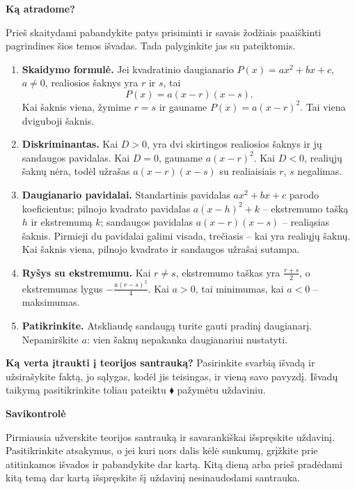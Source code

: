 \documentclass[12pt,a4paper]{article}
\begin{document}
\newpage
\begin{center}{\Large\bfseries Ką atradome?}\end{center}
Prieš skaitydami pabandykite patys prisiminti ir savais žodžiais paaiškinti pagrindines šios temos išvadas. Tada palyginkite jas su pateiktomis.
\begin{tcolorbox}[title=Svarbiausios temos išvados,colback=black!3,colframe=black!65,boxrule=0.6pt,arc=2mm]
\begin{enumerate}
\item \textbf{Skaidymo formulė.} Jei kvadratinio daugianario $P(x)=ax^2+bx+c$, $a\ne0$, realiosios šaknys yra $r$ ir $s$, tai
\[P(x)=a(x-r)(x-s).\]
Kai šaknis viena, žymime $r=s$ ir gauname $P(x)=a(x-r)^2$. Tai viena dviguboji šaknis.
\item \textbf{Diskriminantas.} Kai $D>0$, yra dvi skirtingos realiosios šaknys ir jų sandaugos pavidalas. Kai $D=0$, gauname $a(x-r)^2$. Kai $D<0$, realiųjų šaknų nėra, todėl užrašas $a(x-r)(x-s)$ su realiaisiais $r$, $s$ negalimas.
\item \textbf{Daugianario pavidalai.} Standartinis pavidalas $ax^2+bx+c$ parodo koeficientus; pilnojo kvadrato pavidalas $a(x-h)^2+k$ – ekstremumo tašką $h$ ir ekstremumą $k$; sandaugos pavidalas $a(x-r)(x-s)$ – realiąsias šaknis. Pirmieji du pavidalai galimi visada, trečiasis – kai yra realiųjų šaknų. Kai šaknis viena, pilnojo kvadrato ir sandaugos užrašai sutampa.
\item \textbf{Ryšys su ekstremumu.} Kai $r\ne s$, ekstremumo taškas yra $\frac{r+s}{2}$, o ekstremumas lygus $-\frac{a(r-s)^2}{4}$. Kai $a>0$, tai minimumas, kai $a<0$ – maksimumas.
\item \textbf{Patikrinkite.} Atskliaudę sandaugą turite gauti pradinį daugianarį. Nepamirškite $a$: vien šaknų nepakanka daugianariui nustatyti.
\end{enumerate}
\end{tcolorbox}
\textbf{Ką verta įtraukti į teorijos santrauką?} Pasirinkite svarbią išvadą ir užsirašykite faktą, jo sąlygas, kodėl jis teisingas, ir vieną savo pavyzdį. Išvadų taikymą pasitikrinkite toliau pateiktu $\blacklozenge$ pažymėtu uždaviniu.
\newpage
\begin{center}{\Large\bfseries Savikontrolė}\end{center}
Pirmiausia užverskite teorijos santrauką ir savarankiškai išspręskite uždavinį. Pasitikrinkite atsakymus, o jei kuri nors dalis kėlė sunkumų, grįžkite prie atitinkamos išvados ir pabandykite dar kartą. Kitą dieną arba prieš pradėdami kitą temą dar kartą išspręskite šį uždavinį nesinaudodami santrauka.
\end{document}
